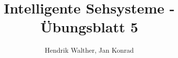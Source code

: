 \documentclass[deutsch]{llncs}
\begin{document}
\title{Intelligente Sehsysteme - Übungsblatt 5}


\author{Hendrik Walther, Jan Konrad}
\institute{}
\maketitle

\end{document}
